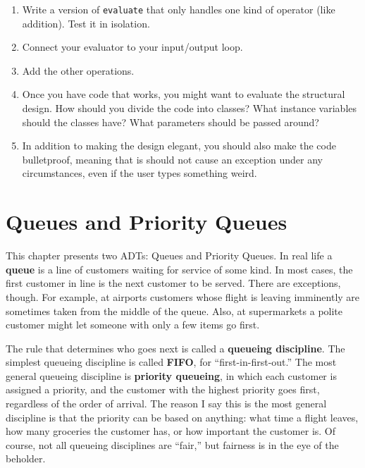 \begin{exercise}
\begin {enumerate}
\item Write a version of {\tt evaluate} that only handles one
kind of operator (like addition).  Test it in isolation.

\item Connect your evaluator to your input/output loop.

\item Add the other operations.

\item Once you have code that works, you might want to evaluate
the structural design.  How should you divide the code into
classes?  What instance variables should the classes have?  What
parameters should be passed around?

\item In addition to making the design elegant, you should also
make the code bulletproof, meaning that is should not cause an
exception under any circumstances, even if the user types something
weird.

\end{enumerate}
\end{exercise}



\beforechapter
\chapter{Queues and Priority Queues}
\label{chap16}
\label{queue}

This chapter presents two ADTs: Queues and Priority Queues.
In real life a {\bf queue} is a line of customers waiting for service
of some kind.  In most cases, the first customer in line is the
next customer to be served.  There are exceptions, though.  For
example, at airports customers whose flight is leaving imminently
are sometimes taken from the middle of the queue.  Also, at
supermarkets a polite customer might let someone with only a
few items go first.

The rule that determines who goes next is called a 
{\bf queueing discipline}.  The simplest queueing discipline is
called {\bf FIFO}, for ``first-in-first-out.''  The most general
queueing discipline is {\bf priority queueing}, in which each customer
is assigned a priority, and the customer with the highest priority
goes first, regardless of the order of arrival.  The reason I
say this is the most general discipline is that the priority
can be based on anything: what time a flight leaves, how many
groceries the customer has, or how important the customer is.
Of course, not all queueing disciplines are ``fair,'' but
fairness is in the eye of the beholder.

